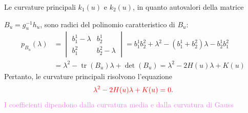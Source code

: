         \begin{osservazione}
        Le curvature principali $k_1(u)$ e $k_2(u)$, in quanto autovalori della matrice 
        
        $B_u = g_u^{-1} h_u$, sono radici del polinomio caratteristico di $B_u$:
        \begin{align*}
        p_{B_u}(\lambda) &= \begin{vmatrix} b_1^1 - \lambda & b_2^1 \\ b_1^2 & b_2^2 - \lambda \end{vmatrix} = b_1^1 b_2^2 + \lambda^2 - (b_1^1 + b_2^2)\lambda - b_2^1 b_1^2 \\
        &= \lambda^2 - \operatorname{tr}(B_u)\lambda + \det(B_u) = \lambda^2 - 2 H(u) \lambda + K(u)
        \end{align*}
        Pertanto, le curvature principali risolvono l'equazione 
        \begin{equation}
        \label{eq:curvature_principali_1}
        \color{red} \lambda^2 - 2 H(u)\lambda + K(u) = 0.
        \end{equation}
        \textcolor{violet}{I coefficienti dipendono dalla curvatura media e dalla curvatura di Gauss}
        \end{osservazione}
        \newpage
